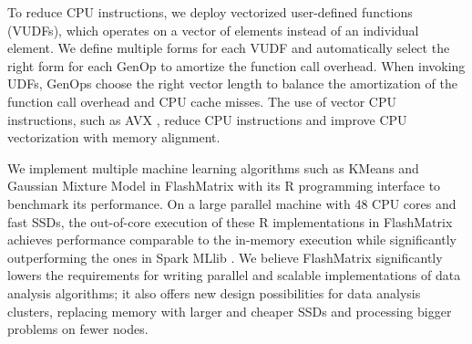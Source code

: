 
To reduce CPU instructions, we deploy vectorized user-defined
functions (VUDFs), which operates on a vector of elements instead of
an individual element. We define multiple forms for each VUDF and automatically
select the right form for each GenOp to amortize the function call overhead.
When invoking UDFs, GenOps choose the right vector length to balance
the amortization of the function call overhead and CPU cache misses. The use
of vector CPU instructions, such as AVX \cite{avx}, reduce CPU
instructions and improve CPU vectorization with memory alignment.


We implement multiple machine learning algorithms such as KMeans \cite{kmeans}
and Gaussian Mixture Model \cite{gmm} in FlashMatrix with its R programming
interface to benchmark its performance. On a large parallel machine with 48
CPU cores and fast SSDs, the out-of-core execution of these R implementations
in FlashMatrix achieves performance comparable to the in-memory execution
while significantly outperforming the ones in Spark MLlib \cite{spark}.
We believe FlashMatrix significantly lowers the requirements for writing parallel
and scalable implementations of data analysis algorithms; it also offers new
design possibilities for data analysis clusters, replacing memory with larger
and cheaper SSDs and processing bigger problems on fewer nodes.
